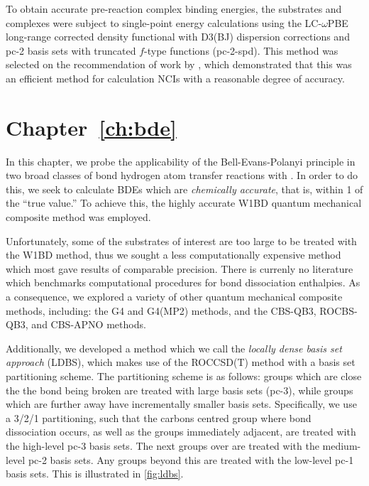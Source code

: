 To obtain accurate pre-reaction complex binding energies, the substrates and
complexes were subject to single-point energy calculations using the
LC-$\omega$PBE long-range corrected density
functional\cite{Vydrov2006,Vydrov2006a} with D3(BJ) dispersion corrections and
pc-2 basis sets with truncated $f$-type functions (pc-2-spd).\cite{Johnson2013}
This method was selected on the recommendation of work by \citet{Johnson2013},
which demonstrated that this was an efficient method for calculation NCIs with a
reasonable degree of accuracy.

\section{Chapter~\ref{ch:bde}}

In this chapter, we probe the applicability of the Bell-Evans-Polanyi principle
in two broad classes of  bond hydrogen atom transfer reactions with \cumo. In
order to do this, we seek to calculate BDEs which are \emph{chemically
  accurate}, that is, within 1 \kcalmol of the ``true value.'' To achieve this,
the highly accurate W1BD\cite{Barnes2009} quantum mechanical composite method
was employed.

Unfortunately, some of the substrates of interest are too large to be treated
with the W1BD method, thus we sought a less computationally expensive method
which most gave results of comparable precision. There is currenly no literature
which benchmarks computational procedures for bond dissociation enthalpies. As a
consequence, we explored a variety of other quantum mechanical composite
methods, including: the G4 and G4(MP2) methods,\cite{Curtiss2007,Curtiss2007a}
and the CBS-QB3, ROCBS-QB3, and CBS-APNO
methods.\cite{Montgomery1999,Montgomery2000,Ochterski1996}

  Additionally, we developed a method which we call the \emph{locally
  dense basis set approach} (LDBS), which makes use of the ROCCSD(T) method with
a basis set partitioning scheme. The partitioning scheme is as follows: groups
which are close the the bond being broken are treated with large basis sets
(pc-3), while groups which are further away have incrementally smaller basis
sets. Specifically, we use a 3/2/1 partitioning, such that the carbons centred
group where bond dissociation occurs, as well as the groups immediately
adjacent, are treated with the high-level pc-3 basis sets. The next groups over
are treated with the medium-level pc-2 basis sets. Any groups beyond this are
treated with the low-level pc-1 basis sets. This is illustrated in
\ref{fig:ldbs}.


